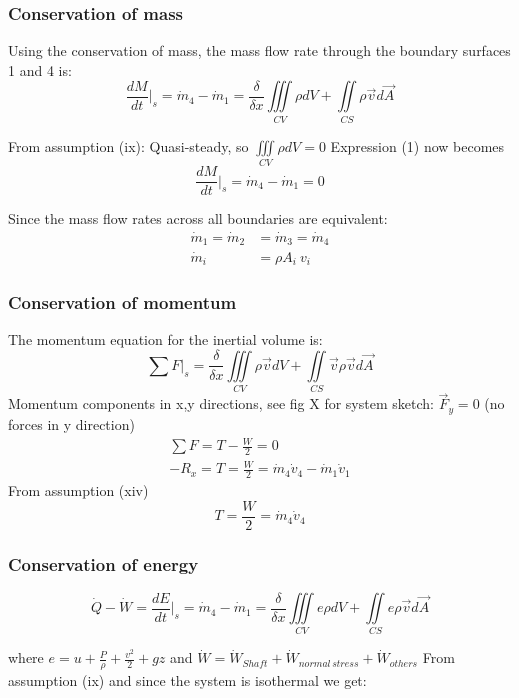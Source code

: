 \subsubsection*{Conservation of mass}
Using the conservation of mass, the mass flow rate through the boundary surfaces 1 and 4 is:
\begin{equation}
\frac{dM}{dt}\bigg|_s= \dot{m}_4 - \dot{m}_1 = 
\frac{\delta}{\delta x} \iiint\limits_{CV}\rho dV +\iint\limits_{CS} \rho  \overrightarrow{v}d \overrightarrow{A} 
\end{equation}

From assumption (ix): Quasi-steady, so $\iiint\limits_{CV}\rho dV = 0$
Expression (1) now becomes 
$$ \frac{dM}{dt}\bigg|_s= \dot{m}_4 - \dot{m}_1 =0 $$

Since the mass flow rates across all boundaries are equivalent:
\begin{align}
\dot{m}_1 = \dot{m}_2 &= \dot{m}_3 = \dot{m}_4 \\
\dot{m}_i &= \rho A_i\ v_i
\end{align}

\subsubsection*{Conservation of momentum}
The momentum equation for the inertial volume is:
\begin{equation}
\sum F\big|_s= 
\frac{\delta}{\delta x} \iiint\limits_{CV}\rho \overrightarrow{v} dV +\iint\limits_{CS} \overrightarrow{v}\rho  \overrightarrow{v}d \overrightarrow{A} 
\end{equation}
Momentum components in x,y directions, see fig X for system sketch: $ \overrightarrow{F}_y =0  $ (no forces in y direction)
\begin{align}
\sum F = T - \frac{W}{2} = 0\\
-R_x = T = \frac{W}{2} =  \dot{m}_4 \dot{v}_4 -  \dot{m}_1 \dot{v}_1
\end{align}
From assumption (xiv)
\begin{equation}
T = \frac{W}{2} =  \dot{m}_4 \dot{v}_4
\end{equation}
\subsubsection*{Conservation of energy}
\begin{equation}
\dot{Q} - \dot{W} =
\frac{dE}{dt}\bigg|_s= \dot{m}_4 - \dot{m}_1 = 
\frac{\delta}{\delta x} \iiint\limits_{CV}e \rho dV +\iint\limits_{CS} e\rho  \overrightarrow{v}d \overrightarrow{A} 
\end{equation}

where $e=u+\frac{P}{\rho}+\frac{v^2}{2}+gz $ and $\dot{W}=\dot{W}_{Shaft}+\dot{W}_{normal \, stress}+\dot{W}_{others}$
From assumption (ix) and since the system is isothermal we get:













